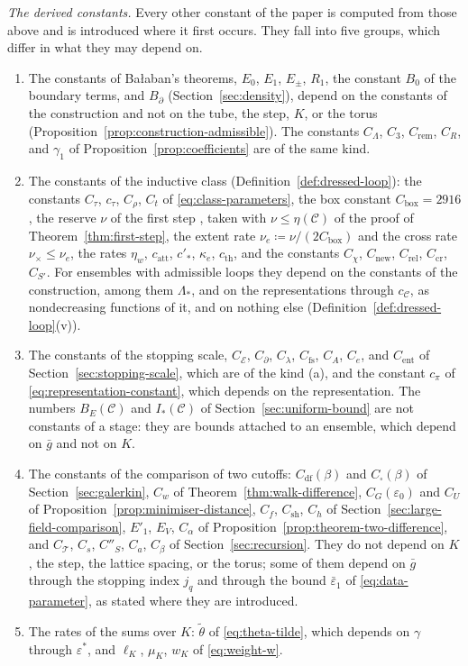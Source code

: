 \documentclass[11pt]{preprint}
\numberwithin{equation}{section}
\theoremstyle{definition}
\theoremstyle{remark}
\theoremstyle{plain}
\begin{document}
\emph{The derived constants.} Every other constant of the paper is computed from those above and is introduced where it first occurs. They fall into five groups, which differ in what they may depend on.
\begin{enumerate}[label=(\alph*)]
\item The constants of Ba{\l}aban's theorems, $E_0$, $E_1$, $E_\pm$, $R_1$, the constant $B_0$ of the boundary terms, and $B_\partial$ (Section~\ref{sec:density}), depend on the constants of the construction and not on the tube, the step, $K$, or the torus (Proposition~\ref{prop:construction-admissible}). The constants $C_\Lambda$, $C_3$, $C_{\mathrm{rem}}$, $C_R$, and $\gamma_1$ of Proposition~\ref{prop:coefficients} are of the same kind.
\item The constants of the inductive class (Definition~\ref{def:dressed-loop}): the constants $C_\tau$, $c_\tau$, $C_\rho$, $C_t$ of \eqref{eq:class-parameters}, the box constant $C_{\mathrm{box}} = 2916$, the reserve $\nu$ of the first step \cite{WilsonFirstStep}, taken with $\nu \leq \eta(\mathcal C)$ of the proof of Theorem~\ref{thm:first-step}, the extent rate $\nu_e \coloneqq \nu/(2C_{\mathrm{box}})$ and the cross rate $\nu_\times \leq \nu_e$, the rates $\eta_w$, $c_{\mathrm{att}}$, $c'_*$, $\kappa_e$, $c_{\mathrm{th}}$, and the constants $C_\chi$, $C_{\mathrm{new}}$, $C_{\mathrm{rel}}$, $C_{\mathrm{cr}}$, $C_{S'}$. For ensembles with admissible loops they depend on the constants of the construction, among them $\Lambda_*$, and on the representations through $c_{\mathcal C}$, as nondecreasing functions of it, and on nothing else (Definition~\ref{def:dressed-loop}(v)).
\item The constants of the stopping scale, $C_{\mathcal E}$, $C_\partial$, $C_\lambda$, $C_{\mathrm{fs}}$, $C_A$, $C_e$, and $C_{\mathrm{ent}}$ of Section~\ref{sec:stopping-scale}, which are of the kind (a), and the constant $c_\pi$ of \eqref{eq:representation-constant}, which depends on the representation. The numbers $B_E(\mathcal C)$ and $I_*(\mathcal C)$ of Section~\ref{sec:uniform-bound} are not constants of a stage: they are bounds attached to an ensemble, which depend on $\bar g$ and not on $K$.
\item The constants of the comparison of two cutoffs: $C_{\mathrm{df}}(\beta)$ and $C_\square(\beta)$ of Section~\ref{sec:galerkin}, $C_w$ of Theorem~\ref{thm:walk-difference}, $C_G(\varepsilon_0)$ and $C_U$ of Proposition~\ref{prop:minimiser-distance}, $C_f$, $C_{\mathrm{sh}}$, $C_h$ of Section~\ref{sec:large-field-comparison}, $E'_1$, $E_V$, $C_\alpha$ of Proposition~\ref{prop:theorem-two-difference}, and $C_{\mathcal T}$, $C_s$, $C''_S$, $C_a$, $C_\beta$ of Section~\ref{sec:recursion}. They do not depend on $K$, the step, the lattice spacing, or the torus; some of them depend on $\bar g$ through the stopping index $j_q$ and through the bound $\bar\varepsilon_1$ of \eqref{eq:data-parameter}, as stated where they are introduced.
\item The rates of the sums over $K$: $\tilde\theta$ of \eqref{eq:theta-tilde}, which depends on $\gamma$ through $\varepsilon^*$, and $\ell_K$, $\mu_K$, $w_K$ of \eqref{eq:weight-w}.
\end{enumerate}
\end{document}
